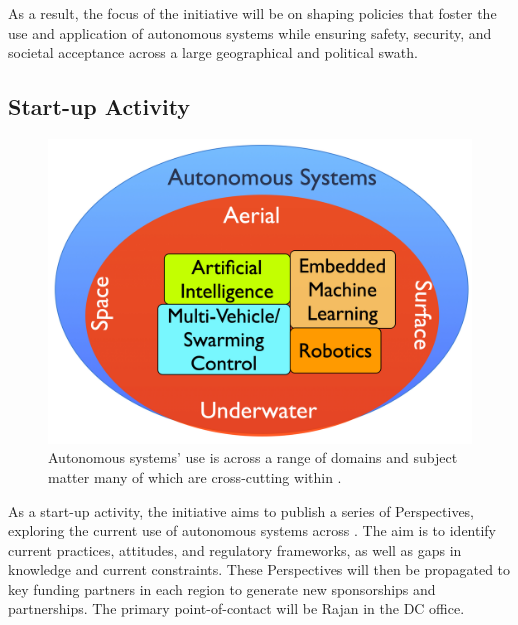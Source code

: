 \documentclass[11pt,letterpaper]{article}
\begin{document}
As a result, the focus of the initiative will be on shaping policies
that foster the use and application of autonomous systems while
ensuring safety, security, and societal acceptance across a large
geographical and political swath.



\subsection{Start-up Activity}

\begin{figure}[!b]
  \centering
  \includegraphics[scale=0.09]{fig/domain-areas.jpg}
  \caption{Autonomous systems' use is across a range of domains and
    subject matter many of which are cross-cutting within \orge.}
 \label{fig:topics}
\end{figure}

As a start-up activity, the initiative aims to publish a series of
Perspectives, exploring the current use of autonomous systems across
\auke. The aim is to identify current practices, attitudes, and
regulatory frameworks, as well as gaps in knowledge and current
constraints. These Perspectives will then be propagated to key funding
partners in each region to generate new sponsorships and
partnerships. The primary point-of-contact will be Rajan in the DC
office.
\end{document}
